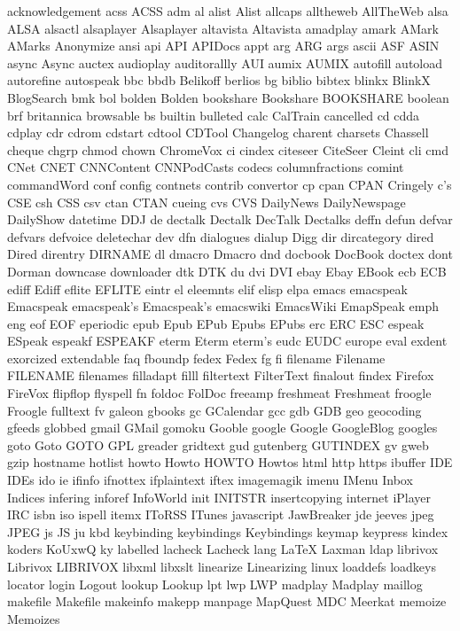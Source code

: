 acknowledgement
acss
ACSS
adm
al
alist
Alist
allcaps
alltheweb
AllTheWeb
alsa
ALSA
alsactl
alsaplayer
Alsaplayer
altavista
Altavista
amadplay
amark
AMark
AMarks
Anonymize
ansi
api
API
APIDocs
appt
arg
ARG
args
ascii
ASF
ASIN
async
Async
auctex
audioplay
auditorallly
AUI
aumix
AUMIX
autofill
autoload
autorefine
autospeak
bbc
bbdb
Belikoff
berlios
bg
biblio
bibtex
blinkx
BlinkX
BlogSearch
bmk
bol
bolden
Bolden
bookshare
Bookshare
BOOKSHARE
boolean
brf
britannica
browsable
bs
builtin
bulleted
calc
CalTrain
cancelled
cd
cdda
cdplay
cdr
cdrom
cdstart
cdtool
CDTool
Changelog
charent
charsets
Chassell
cheque
chgrp
chmod
chown
ChromeVox
ci
cindex
citeseer
CiteSeer
Cleint
cli
cmd
CNet
CNET
CNNContent
CNNPodCasts
codecs
columnfractions
comint
commandWord
conf
config
contnets
contrib
convertor
cp
cpan
CPAN
Cringely
c's
CSE
csh
CSS
csv
ctan
CTAN
cueing
cvs
CVS
DailyNews
DailyNewspage
DailyShow
datetime
DDJ
de
dectalk
Dectalk
DecTalk
Dectalks
deffn
defun
defvar
defvars
defvoice
deletechar
dev
dfn
dialogues
dialup
Digg
dir
dircategory
dired
Dired
direntry
DIRNAME
dl
dmacro
Dmacro
dnd
docbook
DocBook
doctex
dont
Dorman
downcase
downloader
dtk
DTK
du
dvi
DVI
ebay
Ebay
EBook
ecb
ECB
ediff
Ediff
eflite
EFLITE
eintr
el
eleemnts
elif
elisp
elpa
emacs
emacspeak
Emacspeak
emacspeak's
Emacspeak's
emacswiki
EmacsWiki
EmapSpeak
emph
eng
eof
EOF
eperiodic
epub
Epub
EPub
Epubs
EPubs
erc
ERC
ESC
espeak
ESpeak
espeakf
ESPEAKF
eterm
Eterm
eterm's
eudc
EUDC
europe
eval
exdent
exorcized
extendable
faq
fboundp
fedex
Fedex
fg
fi
filename
Filename
FILENAME
filenames
filladapt
filll
filtertext
FilterText
finalout
findex
Firefox
FireVox
flipflop
flyspell
fn
foldoc
FolDoc
freeamp
freshmeat
Freshmeat
froogle
Froogle
fulltext
fv
galeon
gbooks
gc
GCalendar
gcc
gdb
GDB
geo
geocoding
gfeeds
globbed
gmail
GMail
gomoku
Gooble
google
Google
GoogleBlog
googles
goto
Goto
GOTO
GPL
greader
gridtext
gud
gutenberg
GUTINDEX
gv
gweb
gzip
hostname
hotlist
howto
Howto
HOWTO
Howtos
html
http
https
ibuffer
IDE
IDEs
ido
ie
ifinfo
ifnottex
ifplaintext
iftex
imagemagik
imenu
IMenu
Inbox
Indices
infering
inforef
InfoWorld
init
INITSTR
insertcopying
internet
iPlayer
IRC
isbn
iso
ispell
itemx
IToRSS
ITunes
javascript
JawBreaker
jde
jeeves
jpeg
JPEG
js
JS
ju
kbd
keybinding
keybindings
Keybindings
keymap
keypress
kindex
koders
KoUxwQ
ky
labelled
lacheck
Lacheck
lang
LaTeX
Laxman
ldap
librivox
Librivox
LIBRIVOX
libxml
libxslt
linearize
Linearizing
linux
loaddefs
loadkeys
locator
login
Logout
lookup
Lookup
lpt
lwp
LWP
madplay
Madplay
maillog
makefile
Makefile
makeinfo
makepp
manpage
MapQuest
MDC
Meerkat
memoize
Memoizes

